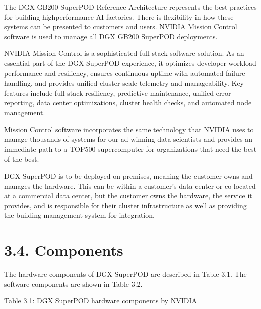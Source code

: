 \documentclass[
  10
]{article}
\begin{document}
The DGX GB200 SuperPOD Reference Architecture represents the best
practices for building highperformance AI factories. There is
flexibility in how these systems can be presented to customers and
users. NVIDIA Mission Control software is used to manage all DGX GB200
SuperPOD deployments.

NVIDIA Mission Control is a sophisticated full-stack software solution.
As an essential part of the DGX SuperPOD experience, it optimizes
developer workload performance and resiliency, ensures continuous uptime
with automated failure handling, and provides unified cluster-scale
telemetry and manageability. Key features include full-stack resiliency,
predictive maintenance, unified error reporting, data center
optimizations, cluster health checks, and automated node management.

Mission Control software incorporates the same technology that NVIDIA
uses to manage thousands of systems for our ad-winning data scientists
and provides an immediate path to a TOP500 supercomputer for
organizations that need the best of the best.

DGX SuperPOD is to be deployed on-premises, meaning the customer owns
and manages the hardware. This can be within a customer's data center or
co-located at a commercial data center, but the customer owns the
hardware, the service it provides, and is responsible for their cluster
infrastructure as well as providing the building management system for
integration.

\section{3.4. Components}\label{components}

The hardware components of DGX SuperPOD are described in Table 3.1. The
software components are shown in Table 3.2.

Table 3.1: DGX SuperPOD hardware components by NVIDIA
\end{document}
